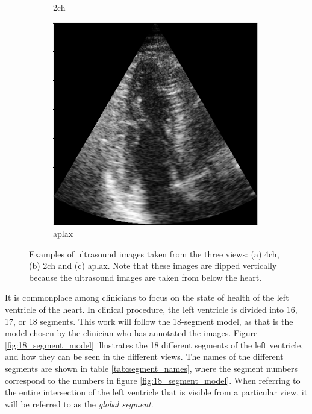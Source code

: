 \begin{figure}[H]
\begin{subfigure}[b]{0.3\textwidth}
        \caption{\acrshort{2ch}}
        \label{fig:us_view_examples_2ch}
    \end{subfigure}
    \begin{subfigure}[b]{0.3\textwidth}
        \includegraphics[width=0.99\textwidth]{echocardiography/aplax_frame.png}
        \caption{\acrshort{aplax}}
        \label{fig:us_view_examples_aplax}
    \end{subfigure}
    \caption{Examples of ultrasound images taken from the three views: (a) \acrfull{4ch}, (b) \acrfull{2ch} and (c) \acrfull{aplax}. Note that these images are flipped vertically because the ultrasound images are taken from below the heart.}
    \label{fig:us_view_examples}
\end{figure}

It is commonplace among clinicians to focus on the state of health of the left ventricle of the heart. In clinical procedure, the left ventricle is divided into 16, 17, or 18 segments. This work will follow the 18-segment model, as that is the model chosen by the clinician who has annotated the images. Figure \ref{fig:18_segment_model} illustrates the 18 different segments of the left ventricle, and how they can be seen in the different views. The names of the different segments are shown in table \ref{tab:segment_names}, where the segment numbers correspond to the numbers in figure \ref{fig:18_segment_model}. When referring to the entire intersection of the left ventricle that is visible from a particular view, it will be referred to as the \textit{global segment}.

